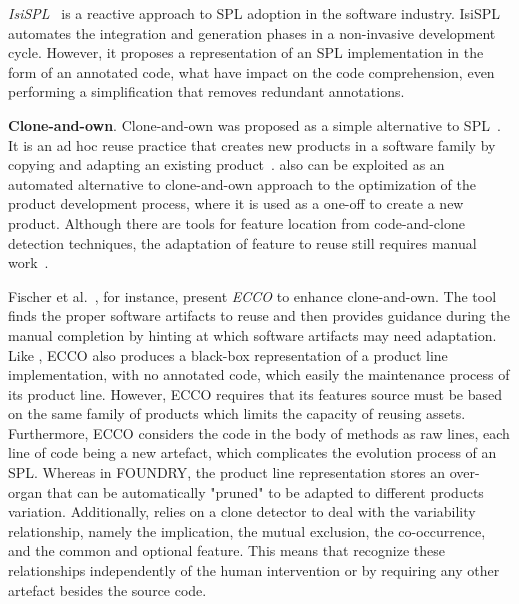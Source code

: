 \emph{IsiSPL}~\cite{hlad2021} is a reactive approach to SPL adoption in the software industry. IsiSPL automates the integration and generation phases in a non-invasive development cycle. However, it proposes a representation of an SPL implementation in the form of an annotated code, what have impact on the code comprehension, even performing a simplification that removes redundant annotations.

\textbf{Clone-and-own}. Clone-and-own was proposed as a simple alternative to SPL~\cite{Dubinsky2013, Fischer2015, Krinke2010, Ray2012, Martinez2015, Stanciulescu2015}. 
It is an ad hoc reuse practice that creates new products in a software family by copying and adapting an existing product~\cite{Dubinsky2013, Fischer2015}. \FOUNDRY also can be exploited as an automated alternative to clone-and-own approach to the optimization of the product development process, where it is used as a one-off to create a new product. Although there are tools for feature location from code-and-clone detection techniques, the adaptation of feature to reuse still requires manual work~\cite{Yoshimura2006, Kastner2014}. 

Fischer et al.~\cite{Fischer2015}, for instance, present \emph{ECCO} to enhance clone-and-own. The tool finds the proper software artifacts to reuse and then provides guidance during the manual completion by hinting at which software artifacts may need adaptation. Like \autoscalpel, ECCO also produces a black-box representation of a product line implementation, with no annotated code, which easily the maintenance process of its product line. However, ECCO requires that its features source must be based on the same family of products which limits the capacity of reusing assets. Furthermore, ECCO considers the code in the body of methods as raw lines, each line of code being a new artefact, which complicates the evolution process of an SPL. Whereas in FOUNDRY, the product line representation stores an over-organ that can be automatically "pruned" to be adapted to different products variation. Additionally, \autoscalpel relies on a clone detector to deal with the variability relationship, namely the implication, the mutual exclusion, the co-occurrence, and the common and optional feature. This means that \autoscalpel recognize these relationships independently of the human intervention or by requiring any other artefact besides the source code.

